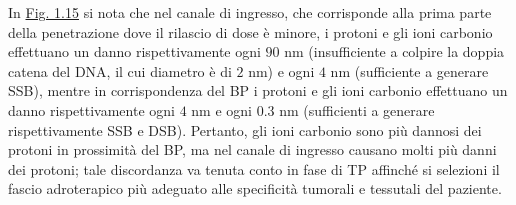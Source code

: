 \documentclass[12pt,a4paper,twoside]{report}
\begin{document}
	In \hyperref[fig:proton_carbon_let]{Fig. 1.15} si nota che nel canale di ingresso, che corrisponde alla prima parte della penetrazione dove il rilascio di dose è minore, i protoni e gli ioni carbonio effettuano un danno rispettivamente ogni $90 \mbox{ nm}$ (insufficiente a colpire la doppia catena del DNA, il cui diametro è di $2 \mbox{ nm}$) e ogni $4 \mbox{ nm}$ (sufficiente a generare SSB), mentre in corrispondenza del BP i protoni e gli ioni carbonio effettuano un danno rispettivamente ogni $4 \mbox{ nm}$ e ogni $0.3 \mbox{ nm}$ (sufficienti a generare rispettivamente SSB e DSB). Pertanto, gli ioni carbonio sono più dannosi dei protoni in prossimità del BP, ma nel canale di ingresso causano molti più danni dei protoni; tale discordanza va tenuta conto in fase di TP affinché si selezioni il fascio adroterapico più adeguato alle specificità tumorali e tessutali del paziente.
	
\end{document}
